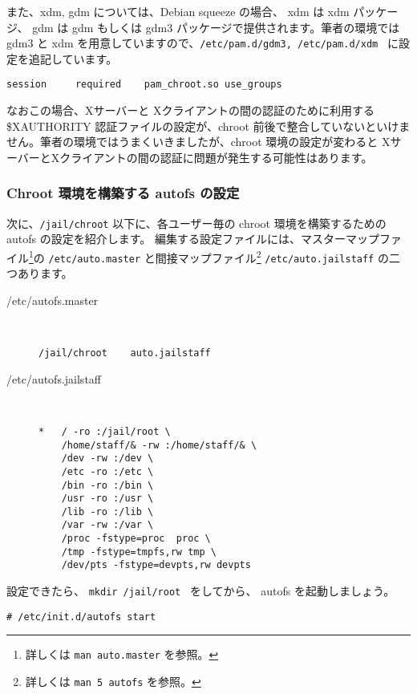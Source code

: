 また、xdm, gdm については、Debian squeeze の場合、 xdm は xdm パッケージ、 gdm は gdm もしくは gdm3 パッケージで提供されます。筆者の環境では gdm3 と xdm を用意していますので、{\tt /etc/pam.d/gdm3, /etc/pam.d/xdm } に設定を追記しています。

\begin{verbatim}
session		required	pam_chroot.so use_groups
\end{verbatim}


なおこの場合、Xサーバーと Xクライアントの間の認証のために利用する \$XAUTHORITY 認証ファイルの設定が、chroot 前後で整合していないといけません。筆者の環境ではうまくいきましたが、chroot 環境の設定が変わると XサーバーとXクライアントの間の認証に問題が発生する可能性はあります。

\subsubsection{Chroot 環境を構築する autofs の設定}

次に、{\tt /jail/chroot} 以下に、各ユーザー毎の chroot 環境を構築するための autofs の設定を紹介します。
編集する設定ファイルには、マスターマップファイル\footnote{詳しくは {\tt man auto.master} を参照。}の {\tt /etc/auto.master} と間接マップファイル\footnote{詳しくは {\tt man 5 autofs} を参照。} {\tt /etc/auto.jailstaff} の二つあります。
\begin{description}
\item[/etc/autofs.master]
{\small \ \par
\begin{verbatim}
/jail/chroot	auto.jailstaff
\end{verbatim}
}

\item[/etc/autofs.jailstaff]
{\small \ \par
\begin{verbatim}
*	/ -ro :/jail/root \
	/home/staff/& -rw :/home/staff/& \
	/dev -rw :/dev \
	/etc -ro :/etc \
	/bin -ro :/bin \
	/usr -ro :/usr \
	/lib -ro :/lib \
	/var -rw :/var \
	/proc -fstype=proc  proc \
	/tmp -fstype=tmpfs,rw tmp \
	/dev/pts -fstype=devpts,rw devpts
\end{verbatim}
}
\end{description}


設定できたら、 {\tt mkdir /jail/root } をしてから、 autofs を起動しましょう。

\begin{verbatim}
# /etc/init.d/autofs start
\end{verbatim}

